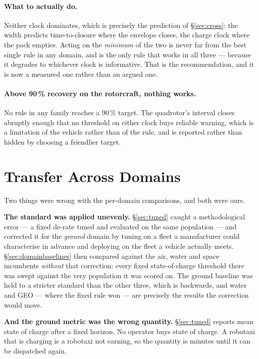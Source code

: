 \documentclass[11pt,letterpaper]{article}
\theoremstyle{definition}
\theoremstyle{remark}
\begin{document}
\paragraph{What to actually do.} Neither clock dominates, which is precisely the prediction of
\S\ref{sec:cross}: the width predicts time-to-closure where the envelope closes, the charge
clock where the pack empties. Acting on the \emph{minimum} of the two is never far from the best
single rule in any domain, and is the only rule that works in all three --- because it degrades
to whichever clock is informative. That is the recommendation, and it is now a measured one
rather than an argued one.

\paragraph{Above 90\,\% recovery on the rotorcraft, nothing works.} No rule in any family
reaches a 90\,\% target. The quadrotor's interval closes abruptly enough that no threshold on
either clock buys reliable warning, which is a limitation of the vehicle rather than of the
rule, and is reported rather than hidden by choosing a friendlier target.



\section{Transfer Across Domains}\label{sec:transfer}

Two things were wrong with the per-domain comparisons, and both were ours.

\textbf{The standard was applied unevenly.} \S\ref{sec:tuned} caught a methodological error ---
a fixed de-rate tuned and evaluated on the same population --- and corrected it for the
\emph{ground} domain by tuning on a fleet a manufacturer could characterise in advance and
deploying on the fleet a vehicle actually meets. \S\ref{sec:domainbaselines} then compared
against the air, water and space incumbents \emph{without} that correction: every fixed
state-of-charge threshold there was swept against the very population it was scored on. The
ground baseline was held to a stricter standard than the other three, which is backwards, and
water and GEO --- where the fixed rule won --- are precisely the results the correction would
move.

\textbf{And the ground metric was the wrong quantity.} \S\ref{sec:tuned} reports mean state of
charge after a fixed horizon. No operator buys state of charge. A robotaxi that is charging is a
robotaxi not earning, so the quantity is minutes until it can be dispatched again.
\end{document}
